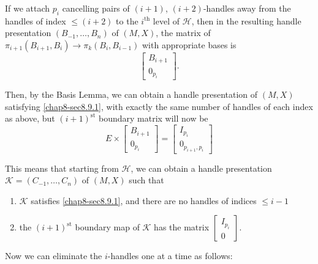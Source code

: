 If we attach $p_{i}$ cancelling pairs of $(i+1)$, $(i+2)$-handles away from the handles of index $\leq (i+2)$ to the $i^{\text{th}}$ level of $\mathscr{H}$, then in the resulting handle presentation $(B_{-1},\ldots,B_{n})$ of $(M,X)$, the matrix of $\pi_{i+1}(B_{i+1},B_{i})\to \pi_{k}(B_{i},B_{i-1})$ with appropriate bases is$$
\begin{bmatrix}
B_{i+1}\\
0_{p_{i}}
\end{bmatrix}.
$$

Then, by the Basis Lemma, we can obtain a handle presentation of $(M,X)$ satisfying \ref{chap8-sec8.9.1}, with exactly the same number of handles of each index as above, but $(i+1)^{\text{st}}$ boundary matrix will now be 
$$
E\times
\begin{bmatrix}
B_{i+1}\\
0_{p_{i}}
\end{bmatrix}
=
\begin{bmatrix}
I_{p_{i}}\\
0_{p_{i+1},p_{i}}
\end{bmatrix}
$$\pageoriginale

This means that starting from $\mathscr{H}$, we can obtain a handle presentation $\mathscr{K}=(C_{-1},\ldots,C_{n})$ of $(M,X)$ such that 
\begin{enumerate}
\renewcommand{\labelenumi}{(\theenumi)}
\item $\mathscr{K}$ satisfies \ref{chap8-sec8.9.1}, and there are no handles of indices $\leq i-1$

\item the $(i+1)^{\text{st}}$ boundary map of $\mathscr{K}$ has the matrix $\left[\begin{smallmatrix} I_{p_{i}}\\ 0\end{smallmatrix}\right]$.
\end{enumerate}

Now we can eliminate the $i$-handles one at a time as follows:

